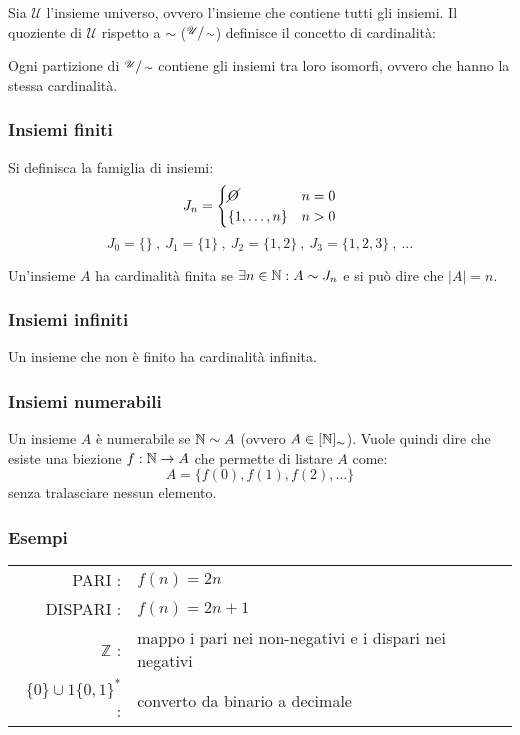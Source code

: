 Sia $\mathscr{U}$ l'insieme universo, ovvero l'insieme che contiene tutti gli insiemi.
Il quoziente di $\mathscr{U}$ rispetto a $\sim$ ($\sfrac{\mathscr{U}}{\sim}$) definisce il 
concetto di cardinalità:

\begin{figure}[H]
    \centering
    
\end{figure}

Ogni partizione di $\sfrac{\mathscr{U}}{\sim}$ contiene gli insiemi tra loro isomorfi, ovvero
che hanno la stessa cardinalità.

\subsubsection*{Insiemi finiti}
Si definisca la famiglia di insiemi: 
$$J_n=\begin{cases}
\cancel{O} & n=0\\
\{1,\dots ,n\} & n>0
\end{cases}$$
$$ J_0=\{\}\ , \ J_1=\{1\} \ , \ J_{2}=\{1,2\} \ , \ J_{3}=\{1,2,3\}\ , \ \dots $$

Un'insieme $A$ ha cardinalità finita se $\exists n\in\mathbb{N} : A\sim J_n$ e si può dire che
$|A|=n$.

\subsubsection*{Insiemi infiniti}
Un insieme che non è finito ha cardinalità infinita.

\subsubsection{Insiemi numerabili}
Un insieme $A$ è numerabile se $\mathbb{N}\sim A$ (ovvero $A\in [\mathbb{N}]_\sim$). Vuole quindi dire
che esiste una biezione $f:\mathbb{N}\rightarrow A$ che permette di listare $A$ come:
$$ A = \{f(0),f(1),f(2),\dots\} $$
senza tralasciare nessun elemento.
\subsubsection*{Esempi}
\begin{tabular}{r l}
    PARI :& $f(n)=2n$ \\
    DISPARI :& $f(n)=2n+1$ \\
    $\mathbb{Z}$ :& mappo i pari nei non-negativi e i dispari nei negativi \\
    $\{0\}\cup 1\{0,1\}^*$ :& converto da binario a decimale \\
\end{tabular}

